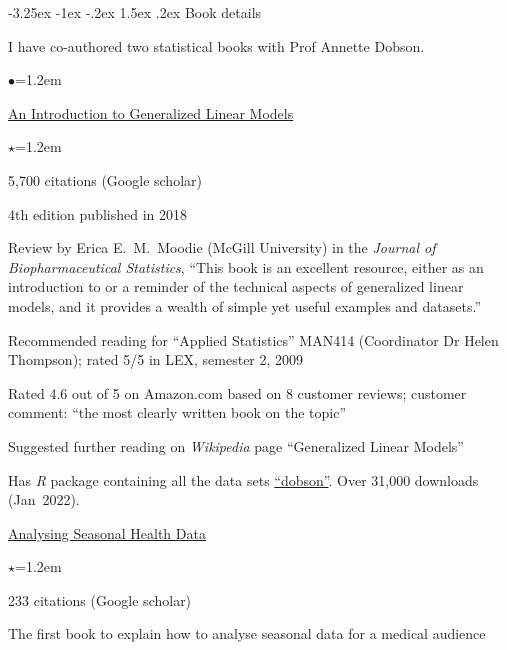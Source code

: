 \documentclass[a4paper,11pt]{article}
\makeatletter
\renewcommand\subsection{\@startsection{subsection}{2}{\z@}%
                                       {-3.25ex \@plus -1ex \@minus -.2ex}%
                                       {1.5ex \@plus .2ex}%
                                   {\normalfont\normalsize\bfseries\color{blue}}}
\renewcommand{\labelitemi}{$\bullet$}
\renewcommand{\labelitemii}{$\star$}
\makeatother
\begin{document}
\begin{raggedright}
\subsection{Book details}

I have co-authored two statistical books with Prof Annette Dobson.
\begin{list}{\labelitemi}{\leftmargin=1.2em}\addtolength{\itemsep}{-0.5\baselineskip}
\item \href{http://www.crcpress.com/product/isbn/9781584889502}{An Introduction to Generalized Linear Models}
\begin{list}{\labelitemii}{\leftmargin=1.2em}\addtolength{\itemsep}{-0.3\baselineskip}
\item 5,700 citations (Google scholar)
\item 4th edition published in 2018
\item Review by Erica E.\ M.\ Moodie (McGill University) in the \textit{Journal of Biopharmaceutical Statistics}, ``This book is an excellent resource, either as an introduction to or a reminder of the technical aspects of generalized linear models, and it provides a wealth of simple yet useful examples and datasets.''
\item Recommended reading for ``Applied Statistics'' MAN414 (Coordinator Dr Helen Thompson); rated 5/5 in LEX, semester 2, 2009
\item Rated 4.6 out of 5 on Amazon.com based on 8 customer reviews; customer comment: ``the most clearly written book on the topic''
\item Suggested further reading on \textit{Wikipedia} page ``Generalized Linear Models''
\item Has \textit{R} package containing all the data sets \href{http://cran.r-project.org/web/packages/dobson/index.html}{``dobson''}. Over 31,000 downloads (Jan~2022). %
\end{list}
\item \href{http://www.springer.com/statistics/stats+life+sci/book/978-3-642-10747-4}{Analysing Seasonal Health Data}
\begin{list}{\labelitemii}{\leftmargin=1.2em}\addtolength{\itemsep}{-0.3\baselineskip}
\item 233 citations (Google scholar)
\item The first book to explain how to analyse seasonal data for a medical audience

\end{list}
\end{list}
\end{raggedright}
\end{document}
